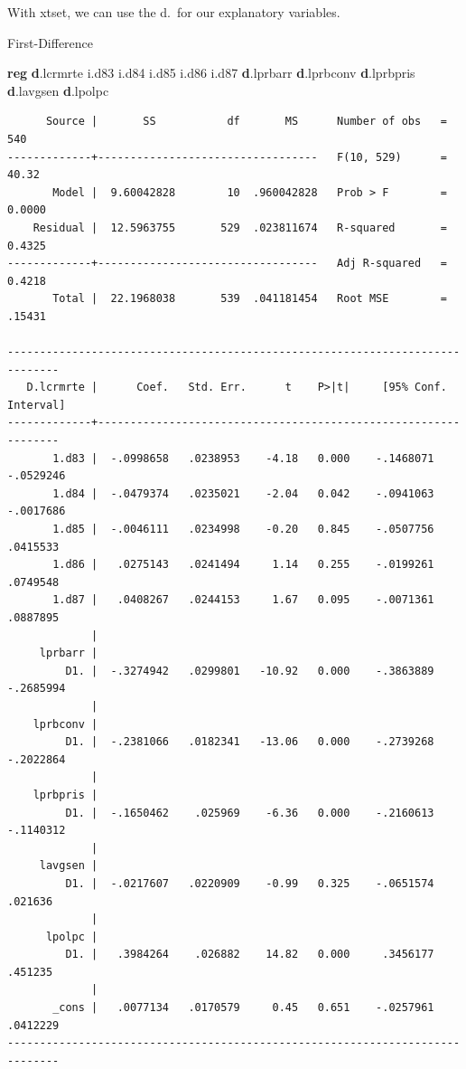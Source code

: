 \documentclass[
]{book}
\newenvironment{Shaded}{\begin{snugshade}}{\end{snugshade}}
\newcommand{\KeywordTok}[1]{\textcolor[rgb]{0.13,0.29,0.53}{\textbf{#1}}}
\newcommand{\NormalTok}[1]{#1}
\begin{document}
With xtset, we can use the d.~for our explanatory variables.

First-Difference

\begin{Shaded}
\begin{Highlighting}[]
\KeywordTok{reg} \KeywordTok{d}\NormalTok{.lcrmrte i.d83 i.d84 i.d85 i.d86 i.d87 }\KeywordTok{d}\NormalTok{.lprbarr }\KeywordTok{d}\NormalTok{.lprbconv }\KeywordTok{d}\NormalTok{.lprbpris }\KeywordTok{d}\NormalTok{.lavgsen }\KeywordTok{d}\NormalTok{.lpolpc}
\end{Highlighting}
\end{Shaded}

\begin{verbatim}
      Source |       SS           df       MS      Number of obs   =       540
-------------+----------------------------------   F(10, 529)      =     40.32
       Model |  9.60042828        10  .960042828   Prob > F        =    0.0000
    Residual |  12.5963755       529  .023811674   R-squared       =    0.4325
-------------+----------------------------------   Adj R-squared   =    0.4218
       Total |  22.1968038       539  .041181454   Root MSE        =    .15431

------------------------------------------------------------------------------
   D.lcrmrte |      Coef.   Std. Err.      t    P>|t|     [95% Conf. Interval]
-------------+----------------------------------------------------------------
       1.d83 |  -.0998658   .0238953    -4.18   0.000    -.1468071   -.0529246
       1.d84 |  -.0479374   .0235021    -2.04   0.042    -.0941063   -.0017686
       1.d85 |  -.0046111   .0234998    -0.20   0.845    -.0507756    .0415533
       1.d86 |   .0275143   .0241494     1.14   0.255    -.0199261    .0749548
       1.d87 |   .0408267   .0244153     1.67   0.095    -.0071361    .0887895
             |
     lprbarr |
         D1. |  -.3274942   .0299801   -10.92   0.000    -.3863889   -.2685994
             |
    lprbconv |
         D1. |  -.2381066   .0182341   -13.06   0.000    -.2739268   -.2022864
             |
    lprbpris |
         D1. |  -.1650462    .025969    -6.36   0.000    -.2160613   -.1140312
             |
     lavgsen |
         D1. |  -.0217607   .0220909    -0.99   0.325    -.0651574     .021636
             |
      lpolpc |
         D1. |   .3984264    .026882    14.82   0.000     .3456177     .451235
             |
       _cons |   .0077134   .0170579     0.45   0.651    -.0257961    .0412229
------------------------------------------------------------------------------
\end{verbatim}
\end{document}
